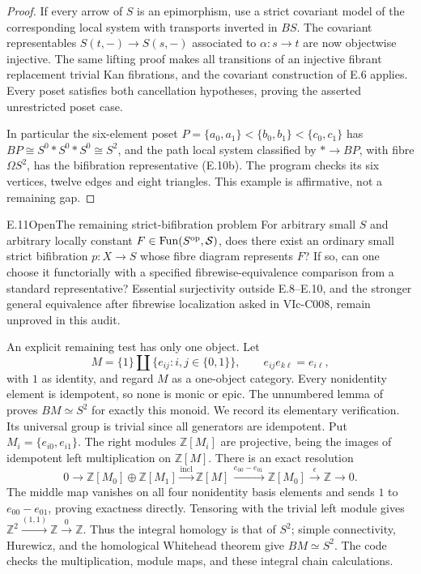 \begin{proof}
If every arrow of $S$ is an epimorphism, use a strict covariant
model of the corresponding local system with transports inverted in
$BS$. The covariant representables $S(t,-)\to S(s,-)$ associated to
$\alpha:s\to t$ are now objectwise injective. The same lifting proof
makes all transitions of an injective fibrant replacement trivial Kan
fibrations, and the covariant construction of E.6 applies.
Every poset satisfies both cancellation hypotheses, proving the
asserted unrestricted poset case.

In particular the six-element poset
$P=\{a_0,a_1\}<\{b_0,b_1\}<\{c_0,c_1\}$ has
$BP\cong S^0*S^0*S^0\cong S^2$, and the path local system classified by
$*\to BP$, with fibre $\Omega S^2$, has the bifibration representative
(E.10b). The program checks its six vertices, twelve edges and eight
triangles. This example is affirmative, not a remaining gap.
\end{proof}

\begin{statement}{E.11}{Open}{The remaining strict-bifibration problem}
For arbitrary small $S$ and arbitrary locally constant $F\in\operatorname{Fun}(S^{\mathrm{op}},\mathcal S)$, does there exist an ordinary small strict bifibration $p:X\to S$ whose fibre diagram represents $F$? If so, can one choose it functorially with a specified fibrewise-equivalence comparison from a standard representative? Essential surjectivity outside E.8--E.10, and the stronger general equivalence after fibrewise localization asked in VIc-C008, remain unproved in this audit.
\end{statement}
An explicit remaining test has only one object. Let
\[
 M=\{1\}\amalg\{e_{ij}:i,j\in\{0,1\}\},\qquad
 e_{ij}e_{k\ell}=e_{i\ell},
\tag{E.11a}
\]
with $1$ as identity, and regard $M$ as a one-object category. Every
nonidentity element is idempotent, so none is monic or epic.
The unnumbered lemma of
\citet[pp.~33--34]{E_Fiedorowicz2002} proves $BM\simeq S^2$ for exactly
this monoid. We record its elementary verification. Its universal group
is trivial since all generators are idempotent. Put
$M_i=\{e_{i0},e_{i1}\}$. The right modules $\mathbb Z[M_i]$ are
projective, being the images of idempotent left multiplication on
$\mathbb Z[M]$. There is an exact resolution
\[
 0\longrightarrow\mathbb Z[M_0]\oplus\mathbb Z[M_1]
 \xrightarrow{\mathrm{incl}}\mathbb Z[M]
 \xrightarrow{\,e_{00}-e_{01}\,}\mathbb Z[M_0]
 \xrightarrow{\epsilon}\mathbb Z\longrightarrow0.
\]
The middle map vanishes on all four nonidentity basis elements and
sends $1$ to $e_{00}-e_{01}$, proving exactness directly. Tensoring
with the trivial left module gives
$\mathbb Z^2\xrightarrow{(1,1)}\mathbb Z\xrightarrow{0}\mathbb Z$.
Thus the integral homology is that of $S^2$; simple connectivity,
Hurewicz, and the homological Whitehead theorem give $BM\simeq S^2$.
The code checks the multiplication, module maps, and these integral
chain calculations.

